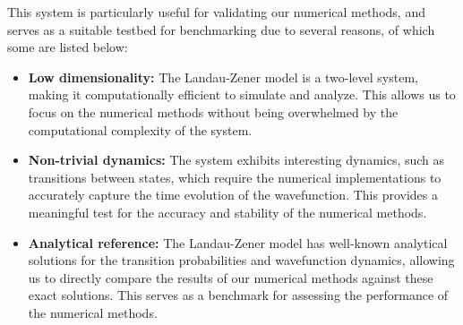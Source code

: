 \documentclass{subfiles}
\begin{document}
This system is particularly useful for validating our numerical methods, and serves as a suitable testbed for benchmarking due to several reasons, of which some are listed below:
\begin{itemize}
    \item \textbf{Low dimensionality:} The Landau-Zener model is a two-level system, making it computationally efficient to simulate and analyze. This allows us to focus on the numerical methods without being overwhelmed by the computational complexity of the system.
    \item \textbf{Non-trivial dynamics:} The system exhibits interesting dynamics, such as transitions between states, which require the numerical implementations to accurately capture the time evolution of the wavefunction. This provides a meaningful test for the accuracy and stability of the numerical methods.
    \item \textbf{Analytical reference:} The Landau-Zener model has well-known analytical solutions for the transition probabilities and wavefunction dynamics, allowing us to directly compare the results of our numerical methods against these exact solutions. This serves as a benchmark for assessing the performance of the numerical methods.
\end{itemize}
\end{document}
